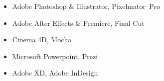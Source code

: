 \MediaSkills 

\begin{itemize}
    \item Adobe Photoshop \& Illustrator, Pixelmator~Pro
    \item Adobe After Effects \& Premiere, Final Cut
    \item Cinema 4D, Mocha
    \item Microsoft Powerpoint, Prezi
    \item Adobe XD, Adobe InDesign
\end{itemize}
